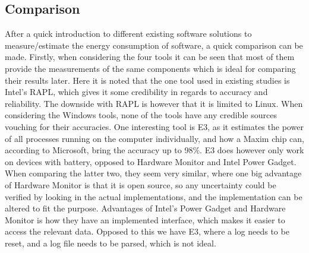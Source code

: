 \subsection{Comparison}\label{subsec:software_comparison}

After a quick introduction to different existing software solutions to measure/estimate the energy consumption of software, a quick comparison can be made. Firstly, when considering the four tools it can be seen that most of them provide the measurements of the  same components which is ideal for comparing their results later. Here it is noted that the one tool used in existing studies is Intel's RAPL, which gives it some credibility in regards to accuracy and reliability. The downside with RAPL is however that it is limited to Linux. When considering the Windows tools, none of the tools have any credible sources vouching for their accuracies. One interesting tool is E3, as it estimates the power of all processes running on the computer individually, and how a Maxim chip can, according to Microsoft, bring the accuracy up to 98\%. \cite[]{E3WinHec} E3 does however only work on devices with battery, opposed to Hardware Monitor and Intel Power Gadget. When comparing the latter two, they seem very similar, where one big advantage of Hardware Monitor is that it is open source, so any uncertainty could be verified by looking in the actual implementations, and the implementation can be altered to fit the purpose. Advantages of Intel's Power Gadget and Hardware Monitor is how they have an implemented interface, which makes it easier to access the relevant data. Opposed to this we have E3, where a log needs to be reset, and a log file needs to be parsed, which is not ideal.